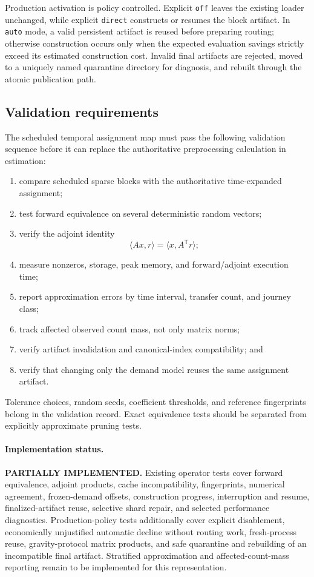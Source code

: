 Production activation is policy controlled.  Explicit \texttt{off} leaves the
existing loader unchanged, while explicit \texttt{direct} constructs or resumes
the block artifact.  In \texttt{auto} mode, a valid persistent artifact is
reused before preparing routing; otherwise construction occurs only when the
expected evaluation savings strictly exceed its estimated construction cost.
Invalid final artifacts are rejected, moved to a uniquely named quarantine
directory for diagnosis, and rebuilt through the atomic publication path.

\subsection{Validation requirements}

The scheduled temporal assignment map must pass the following validation
sequence before it can replace the authoritative preprocessing calculation in
estimation:
\begin{enumerate}
\item compare scheduled sparse blocks with the authoritative time-expanded
  assignment;
\item test forward equivalence on several deterministic random vectors;
\item verify the adjoint identity
  \begin{equation}
    \langle Ax,r\rangle
    =\langle x,A^{\mathsf T}r\rangle;
    \label{eq:planned-adjoint-validation}
  \end{equation}
\item measure nonzeros, storage, peak memory, and forward/adjoint execution
  time;
\item report approximation errors by time interval, transfer count, and
  journey class;
\item track affected observed count mass, not only matrix norms;
\item verify artifact invalidation and canonical-index compatibility; and
\item verify that changing only the demand model reuses the same assignment
  artifact.
\end{enumerate}
Tolerance choices, random seeds, coefficient thresholds, and reference
fingerprints belong in the validation record.  Exact equivalence tests should
be separated from explicitly approximate pruning tests.

\paragraph{Implementation status.}
\textbf{PARTIALLY IMPLEMENTED.}  Existing operator tests cover forward
equivalence, adjoint products, cache incompatibility, fingerprints, numerical
agreement, frozen-demand offsets, construction progress, interruption and
resume, finalized-artifact reuse, selective shard repair, and selected
performance diagnostics.  Production-policy tests additionally cover explicit
disablement, economically unjustified automatic decline without routing work,
fresh-process reuse, gravity-protocol matrix products, and safe quarantine and
rebuilding of an incompatible final artifact.  Stratified approximation and
affected-count-mass reporting remain to be implemented for this representation.

